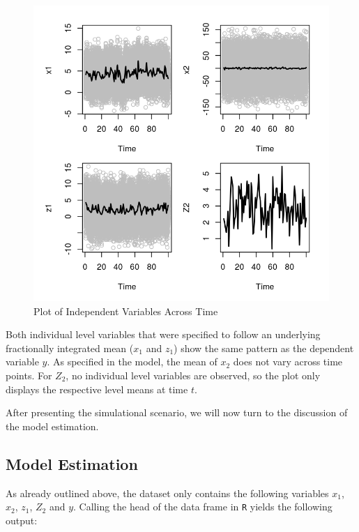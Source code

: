 \documentclass[12pt]{paper}\usepackage[]{graphicx}\usepackage[]{color}
\makeatletter
\def\maxwidth{ %
  \ifdim\Gin@nat@width>\linewidth
    \linewidth
  \else
    \Gin@nat@width
  \fi
}
\newenvironment{knitrout}{}{} %
\makeatother
\begin{document}
\begin{figure}[ht]\centering
\caption{Plot of Independent Variables Across Time}\label{fig:ivs}
\begin{knitrout}
\color{fgcolor}
\includegraphics[width=\maxwidth]{figure/unnamed-chunk-7-1} 

\end{knitrout}
\end{figure}

Both individual level variables that were specified to follow an underlying fractionally integrated mean ($x_1$ and $z_1$) show the same pattern as the dependent variable $y$. As specified in the model, the mean of $x_2$ does not vary across time points. For $Z_2$, no individual level variables are observed, so the plot only displays the respective level means at time $t$.

After presenting the simulational scenario, we will now turn to the discussion of the model estimation.

\subsection{Model Estimation}

As already outlined above, the dataset only contains the following variables $x_1$, $x_2$, $z_1$, $Z_2$ and $y$. Calling the head of the data frame in \texttt{R} yields the following output:
\end{document}
